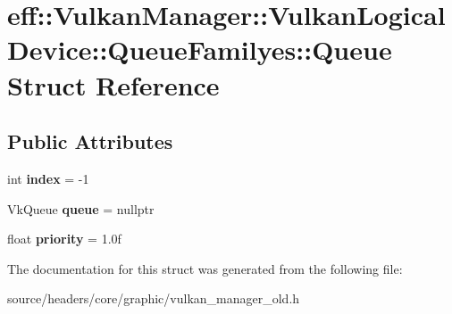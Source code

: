 \hypertarget{structeff_1_1VulkanManager_1_1VulkanLogicalDevice_1_1QueueFamilyes_1_1Queue}{}\section{eff\+:\+:Vulkan\+Manager\+:\+:Vulkan\+Logical\+Device\+:\+:Queue\+Familyes\+:\+:Queue Struct Reference}
\label{structeff_1_1VulkanManager_1_1VulkanLogicalDevice_1_1QueueFamilyes_1_1Queue}
\subsection*{Public Attributes}
\begin{DoxyCompactItemize}
\item 
\mbox{\label{structeff_1_1VulkanManager_1_1VulkanLogicalDevice_1_1QueueFamilyes_1_1Queue_ade7ff940a520eaf0651ab7ba48730ed4}} 
int {\bfseries index} = -\/1
\item 
\mbox{\label{structeff_1_1VulkanManager_1_1VulkanLogicalDevice_1_1QueueFamilyes_1_1Queue_a8886ebe478408166e551044dad8a6ab2}} 
Vk\+Queue {\bfseries queue} = nullptr
\item 
\mbox{\label{structeff_1_1VulkanManager_1_1VulkanLogicalDevice_1_1QueueFamilyes_1_1Queue_a4c6dca8c28bd557cd6d3acb8177699b7}} 
float {\bfseries priority} = 1.\+0f
\end{DoxyCompactItemize}


The documentation for this struct was generated from the following file\+:\begin{DoxyCompactItemize}
\item 
source/headers/core/graphic/vulkan\+\_\+manager\+\_\+old.\+h\end{DoxyCompactItemize}
